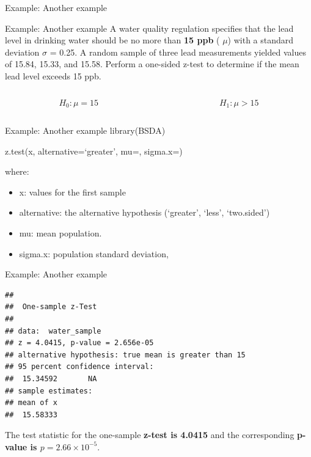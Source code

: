 \documentclass[
  ignorenonframetext,
]{beamer}
\providecommand{\tightlist}{%
  \setlength{\itemsep}{0pt}\setlength{\parskip}{0pt}}
\begin{document}
\begin{frame}{Example: Another example}
\label{example-another-example}
\end{frame}

\begin{frame}{Example: Another example}
\label{example-another-example-1}
A water quality regulation specifies that the lead level in drinking
water should be no more than \textbf{15 ppb} ( \(\mu\)) with a standard
deviation \(\sigma\) = 0.25. A random sample of three lead measurements
yielded values of 15.84, 15.33, and 15.58. Perform a one-sided z-test to
determine if the mean lead level exceeds 15 ppb.

\vspace{0.5cm}

\begin{columns}[T]
\begin{column}{0.5\textwidth}
\[
  H_0: \mu = 15
\]
\end{column}

\begin{column}{0.5\textwidth}
\[
  H_1: \mu > 15
\]
\end{column}
\end{columns}
\end{frame}

\begin{frame}{Example: Another example}
\label{example-another-example-2}
library(BSDA)

z.test(x, alternative=`greater', mu=, sigma.x=)

where:

\begin{itemize}
\tightlist
\item
  x: values for the first sample
\item
  alternative: the alternative hypothesis (`greater', `less',
  `two.sided')
\item
  mu: mean population.
\item
  sigma.x: population standard deviation,
\end{itemize}
\end{frame}

\begin{frame}[fragile]{Example: Another example}
\label{example-another-example-3}
\begin{verbatim}
## 
##  One-sample z-Test
## 
## data:  water_sample
## z = 4.0415, p-value = 2.656e-05
## alternative hypothesis: true mean is greater than 15
## 95 percent confidence interval:
##  15.34592       NA
## sample estimates:
## mean of x 
##  15.58333
\end{verbatim}

The test statistic for the one-sample \textbf{z-test is 4.0415} and the
corresponding \textbf{p-value is \(p = 2.66 \times 10^{-5}\)}.
\end{frame}
\end{document}
